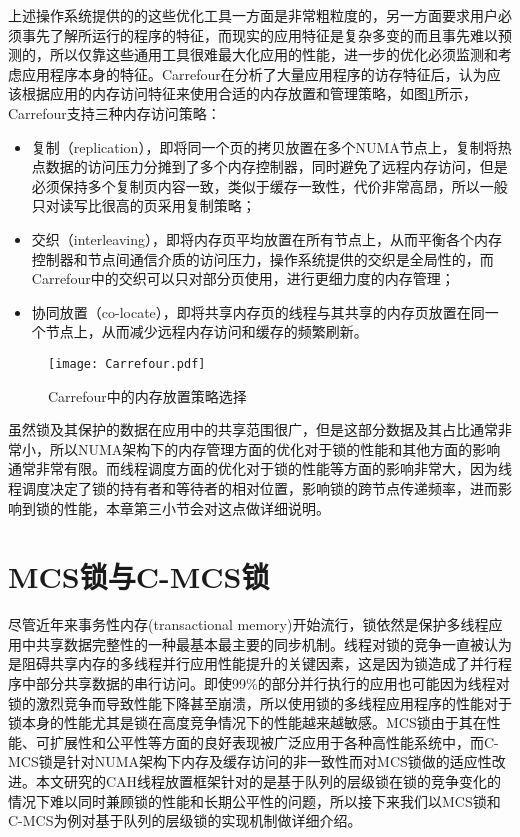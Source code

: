 上述操作系统提供的的这些优化工具一方面是非常粗粒度的，另一方面要求用户必须事先了解所运行的程序的特征，而现实的应用特征是复杂多变的而且事先难以预测的，所以仅靠这些通用工具很难最大化应用的性能，进一步的优化必须监测和考虑应用程序本身的特征。Carrefour\cite{dashti2013traffic}在分析了大量应用程序的访存特征后，认为应该根据应用的内存访问特征来使用合适的内存放置和管理策略，如图\ref{Fig:carrefour}所示，Carrefour支持三种内存访问策略：
\begin{itemize}
\item  复制（replication），即将同一个页的拷贝放置在多个NUMA节点上，复制将热点数据的访问压力分摊到了多个内存控制器，同时避免了远程内存访问，但是必须保持多个复制页内容一致，类似于缓存一致性，代价非常高昂，所以一般只对读写比很高的页采用复制策略；
\item  交织（interleaving），即将内存页平均放置在所有节点上，从而平衡各个内存控制器和节点间通信介质的访问压力，操作系统提供的交织是全局性的，而Carrefour中的交织可以只对部分页使用，进行更细力度的内存管理；
\item 协同放置（co-locate），即将共享内存页的线程与其共享的内存页放置在同一个节点上，从而减少远程内存访问和缓存的频繁刷新。
\end{itemize}

\begin{figure}[t]
	\centering
	\texttt{[image: Carrefour.pdf]}
	\caption{Carrefour中的内存放置策略选择}
	\label{Fig:carrefour}
\end{figure}

虽然锁及其保护的数据在应用中的共享范围很广，但是这部分数据及其占比通常非常小，所以NUMA架构下的内存管理方面的优化对于锁的性能和其他方面的影响通常非常有限。而线程调度方面的优化对于锁的性能等方面的影响非常大，因为线程调度决定了锁的持有者和等待者的相对位置，影响锁的跨节点传递频率，进而影响到锁的性能，本章第三小节会对这点做详细说明。

\section{MCS锁与C-MCS锁}
尽管近年来事务性内存(transactional memory)\cite{larus2008transactional}开始流行，锁依然是保护多线程应用中共享数据完整性的一种最基本最主要的同步机制\cite{tallent2010analyzing}。线程对锁的竞争一直被认为是阻碍共享内存的多线程并行应用性能提升的关键因素，这是因为锁造成了并行程序中部分共享数据的串行访问\cite{tallent2010analyzing}。即使99\%的部分并行执行的应用也可能因为线程对锁的激烈竞争而导致性能下降甚至崩溃，所以使用锁的多线程应用程序的性能对于锁本身的性能尤其是锁在高度竞争情况下的性能越来越敏感\cite{johnson2010decoupling}。MCS锁由于其在性能、可扩展性和公平性等方面的良好表现被广泛应用于各种高性能系统中，而C-MCS锁是针对NUMA架构下内存及缓存访问的非一致性而对MCS锁做的适应性改进。本文研究的CAH线程放置框架针对的是基于队列的层级锁在锁的竞争变化的情况下难以同时兼顾锁的性能和长期公平性的问题，所以接下来我们以MCS锁和C-MCS为例对基于队列的层级锁的实现机制做详细介绍。
